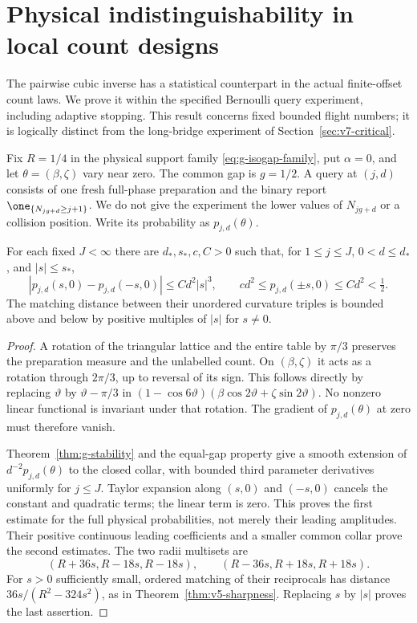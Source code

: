 \section{Physical indistinguishability in local count designs}
\label{sec:v7-lower}
The pairwise cubic inverse has a statistical counterpart in the actual
finite-offset count laws. We prove it within the specified Bernoulli
query experiment, including adaptive stopping. This result concerns
fixed bounded flight numbers; it is logically distinct from the
long-bridge experiment of Section~\ref{sec:v7-critical}.

Fix $R=1/4$ in the physical support family
\eqref{eq:g-isogap-family}, put $\alpha=0$, and let
$\theta=(\beta,\zeta)$ vary near zero. The common gap is $g=1/2$.
A query at $(j,d)$ consists of one fresh full-phase preparation and
the binary report $\one_{\{N_{jg+d}\ge j+1\}}$. We do not give the
experiment the lower values of $N_{jg+d}$ or a collision position.
Write its probability as $p_{j,d}(\theta)$.

\begin{lemma}
\label{lem:v7-cubic}
For each fixed $J<\infty$ there are $d_*,s_*,c,C>0$ such that, for
$1\le j\le J$, $0<d\le d_*$, and $|s|\le s_*$,
\begin{equation}\label{eq:v7-cubic-p}
 |p_{j,d}(s,0)-p_{j,d}(-s,0)|\le Cd^2|s|^3,
 \qquad cd^2\le p_{j,d}(\pm s,0)\le Cd^2<\tfrac12.
\end{equation}
The matching distance between their unordered curvature triples is
bounded above and below by positive multiples of $|s|$ for $s\ne0$.
\end{lemma}
\begin{proof}
A rotation of the triangular lattice and the entire table by $\pi/3$
preserves the preparation measure and the unlabelled count. On
$(\beta,\zeta)$ it acts as a rotation through $2\pi/3$, up to reversal
of its sign. This follows directly by replacing $\vartheta$ by
$\vartheta-\pi/3$ in
$(1-\cos6\vartheta)(\beta\cos2\vartheta+\zeta\sin2\vartheta)$.
No nonzero linear functional is invariant under that rotation.
The gradient of $p_{j,d}(\theta)$ at zero must therefore vanish.

Theorem~\ref{thm:g-stability} and the equal-gap property give a smooth
extension of $d^{-2}p_{j,d}(\theta)$ to the closed collar, with bounded
third parameter derivatives uniformly for $j\le J$. Taylor expansion
along $(s,0)$ and $(-s,0)$ cancels the constant and quadratic terms;
the linear term is zero. This proves the first estimate for the full
physical probabilities, not merely their leading amplitudes. Their
positive continuous leading coefficients and a smaller common collar
prove the second estimates. The two radii multisets are
\[
 (R+36s,R-18s,R-18s),\qquad
 (R-36s,R+18s,R+18s).
\]
For $s>0$ sufficiently small, ordered matching of their reciprocals
has distance $36s/(R^2-324s^2)$, as in
Theorem~\ref{thm:v5-sharpness}. Replacing $s$ by $|s|$ proves the
last assertion.
\end{proof}


